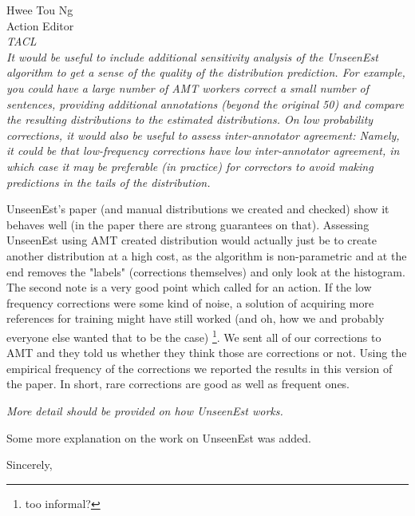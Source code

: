 \documentclass[11pt,letterpaper]{letter}
\begin{document}
\begin{letter}{%
Hwee Tou Ng\\
Action Editor\\
{\em TACL}\\
}
	\emph{It would be useful to include additional sensitivity analysis of the
		UnseenEst algorithm to get a sense of the quality of the distribution
		prediction. For example, you could have a large number of AMT workers
		correct a small number of sentences, providing additional annotations
		(beyond the original 50) and compare the resulting distributions to the
		estimated distributions. On low probability corrections, it would also be
		useful to assess inter-annotator agreement: Namely, it could be that
		low-frequency corrections have low inter-annotator agreement, in which case
		it may be preferable (in practice) for correctors to avoid making
		predictions in the tails of the distribution.
		}
		
		UnseenEst's paper (and manual distributions we created and checked) show it behaves well (in the paper there are strong guarantees on that). Assessing UnseenEst using AMT created distribution would actually just be to create another distribution at a high cost, as the algorithm is non-parametric and at the end removes the "labels" (corrections themselves) and only look at the histogram.
		The second note is a very good point which called for an action. If the low frequency corrections were some kind of noise, a solution of acquiring more references for training might have still worked (and oh, how we and probably everyone else wanted that to be the case) \footnote{too informal?}. We sent all of our corrections to AMT and they told us whether they think those are corrections or not. Using the empirical frequency of the corrections we reported the results in this version of the paper. In short, rare corrections are good as well as frequent ones.
		
		\emph{More detail should be provided on how UnseenEst works.}
		
		Some more explanation on the work on UnseenEst was added.
	
\closing{Sincerely,}

\end{letter}
\end{document}
